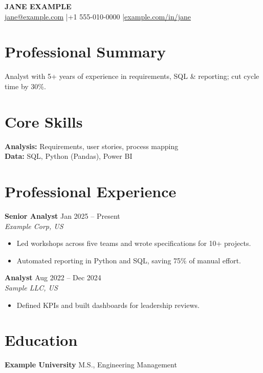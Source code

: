 \documentclass[10pt]{article}
\begin{document}
\begin{center}
{\Large\textbf{JANE EXAMPLE}}\\
\href{mailto:jane@example.com}{jane@example.com}
\quad|\quad +1 555-010-0000
\quad|\quad \href{https://www.example.com/in/jane}{example.com/in/jane}
\end{center}

\section*{Professional Summary}
Analyst with 5+ years of experience in requirements, SQL \& reporting; cut cycle time by 30\%.

\section*{Core Skills}
\textbf{Analysis:} Requirements, user stories, process mapping\\
\textbf{Data:} SQL, Python (Pandas), Power BI

\section*{Professional Experience}
\textbf{Senior Analyst} \hfill Jan 2025 -- Present\\
\textit{Example Corp, US}
\begin{itemize}
\item Led workshops across five teams and wrote specifications for 10+ projects.
\item Automated reporting in Python and SQL, saving 75\% of manual effort.
\end{itemize}

\textbf{Analyst} \hfill Aug 2022 -- Dec 2024\\
\textit{Sample LLC, US}
\begin{itemize}
\item Defined KPIs and built dashboards for leadership reviews.
\end{itemize}

\section*{Education}
\textbf{Example University} \hfill M.S., Engineering Management
\end{document}
